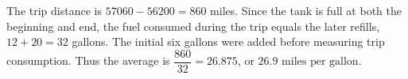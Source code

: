 The trip distance is $57060-56200=860$ miles. Since the tank is full at both the beginning and end, the fuel consumed during the trip equals the later refills, $12+20=32$ gallons. The initial six gallons were added before measuring trip consumption. Thus the average is $\dfrac{860}{32}=26.875$, or $\boxed{26.9\text{ miles per gallon}}$.
